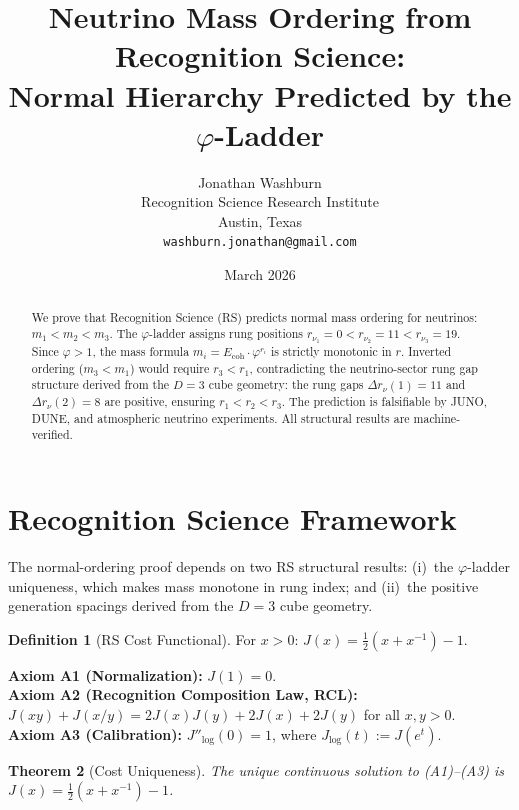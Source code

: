 \documentclass[12pt,a4paper]{article}
\title{Neutrino Mass Ordering from Recognition Science:\\
Normal Hierarchy Predicted by the $\varphi$-Ladder}
\author{Jonathan Washburn\\
Recognition Science Research Institute\\
Austin, Texas\\
\texttt{washburn.jonathan@gmail.com}}
\date{March 2026}
\newtheorem{theorem}{Theorem}[section]
\theoremstyle{definition}
\newtheorem{definition}[theorem]{Definition}
\theoremstyle{remark}
\begin{document}
\maketitle

\begin{abstract}
We prove that Recognition Science (RS) predicts normal mass
ordering for neutrinos: $m_1 < m_2 < m_3$.  The
$\varphi$-ladder assigns rung positions
$r_{\nu_1} = 0 < r_{\nu_2} = 11 < r_{\nu_3} = 19$.  Since
$\varphi > 1$, the mass formula $m_i = E_{\mathrm{coh}} \cdot
\varphi^{r_i}$ is strictly monotonic in $r$.  Inverted ordering
($m_3 < m_1$) would require $r_3 < r_1$, contradicting the
neutrino-sector rung gap structure derived from the $D = 3$ cube
geometry: the rung gaps $\Delta r_\nu(1) = 11$ and
$\Delta r_\nu(2) = 8$ are positive, ensuring $r_1 < r_2 < r_3$.
The prediction is falsifiable by JUNO, DUNE, and atmospheric
neutrino experiments.  All structural results are
machine-verified.
\end{abstract}

\section{Recognition Science Framework}
\label{sec:framework}

The normal-ordering proof depends on two RS structural results:
(i)~the $\varphi$-ladder uniqueness, which makes mass monotone in
rung index; and (ii)~the positive generation spacings derived from
the $D=3$ cube geometry.

\begin{definition}[RS Cost Functional]
For $x > 0$: $J(x) = \tfrac{1}{2}(x + x^{-1}) - 1$.
\end{definition}

\noindent\textbf{Axiom A1 (Normalization):} $J(1) = 0$.\\
\textbf{Axiom A2 (Recognition Composition Law, RCL):}
$J(xy)+J(x/y)=2J(x)J(y)+2J(x)+2J(y)$ for all $x,y>0$.\\
\textbf{Axiom A3 (Calibration):} $J''_{\log}(0) = 1$, where
$J_{\log}(t) := J(e^t)$.

\begin{theorem}[Cost Uniqueness]
\label{thm:unique}
The unique continuous solution to \textup{(A1)--(A3)} is
$J(x) = \tfrac{1}{2}(x + x^{-1}) - 1$.
\end{theorem}
\end{document}
